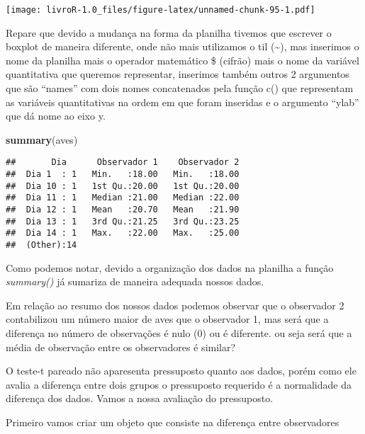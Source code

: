 \documentclass[]{book}
\newenvironment{Shaded}{\begin{snugshade}}{\end{snugshade}}
\newcommand{\DataTypeTok}[1]{\textcolor[rgb]{0.13,0.29,0.53}{#1}}
\newcommand{\KeywordTok}[1]{\textcolor[rgb]{0.13,0.29,0.53}{\textbf{#1}}}
\newcommand{\NormalTok}[1]{#1}
\newcommand{\OperatorTok}[1]{\textcolor[rgb]{0.81,0.36,0.00}{\textbf{#1}}}
\newcommand{\StringTok}[1]{\textcolor[rgb]{0.31,0.60,0.02}{#1}}
\begin{document}
\texttt{[image: livroR-1.0\_files/figure-latex/unnamed-chunk-95-1.pdf]}

Repare que devido a mudança na forma da planilha tivemos que escrever o boxplot de maneira diferente, onde não mais utilizamos o til (\textasciitilde{}), mas inserimos o nome da planilha mais o operador matemático \$ (cifrão) mais o nome da variável quantitativa que queremos representar, inserimos também outros 2 argumentos que são ``names'' com dois nomes concatenados pela função c() que representam as variáveis quantitativas na ordem em que foram inseridas e o argumento ``ylab'' que dá nome ao eixo y.

\begin{Shaded}
\begin{Highlighting}[]
\KeywordTok{summary}\NormalTok{(aves)}
\end{Highlighting}
\end{Shaded}

\begin{verbatim}
##       Dia      Observador 1    Observador 2  
##  Dia 1  : 1   Min.   :18.00   Min.   :18.00  
##  Dia 10 : 1   1st Qu.:20.00   1st Qu.:20.00  
##  Dia 11 : 1   Median :21.00   Median :22.00  
##  Dia 12 : 1   Mean   :20.70   Mean   :21.90  
##  Dia 13 : 1   3rd Qu.:21.25   3rd Qu.:23.25  
##  Dia 14 : 1   Max.   :22.00   Max.   :25.00  
##  (Other):14
\end{verbatim}

Como podemos notar, devido a organização dos dados na planilha a função \emph{summary()} já sumariza de maneira adequada nossos dados.

Em relação ao resumo dos nossos dados podemos observar que o observador 2 contabilizou um número maior de aves que o observador 1, mas será que a diferença no número de observações é nulo (0) ou é diferente. ou seja será que a média de observação entre os observadores é similar?

O teste-t pareado não aparesenta pressuposto quanto aos dados, porém como ele avalia a diferença entre dois grupos o pressuposto requerido é a normalidade da diferença dos dados. Vamos a nossa avaliação do pressuposto.

Primeiro vamos criar um objeto que consiste na diferença entre observadores

\begin{Shaded}
\end{Shaded}
\end{document}
